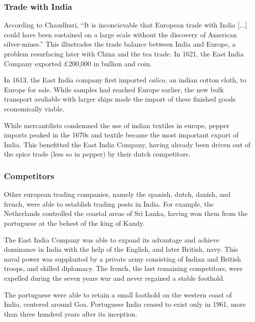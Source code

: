 \documentclass[11pt, a4paper, headings=standardclasses]{scrartcl}
\begin{document}
\subsubsection{Trade with India}

According to Chaudhuri, ``It is inconcievable that European trade with India [...] could have been sustained on a large scale without the discovery of American silver-mines.''\autocite[395]{FT} This illustrades the trade balance between India and Europe, a problem resurfacing later with China and the tea trade. In 1621, the East India Company exported \pounds{}200,000 in bullion and coin.\autocite[398]{FT}

In 1613, the East India company first imported \textit{calico}, an indian cotton cloth, to Europe for sale. While samples had reached Europe earlier, the new bulk transport avaliable with larger ships made the import of these finished goods economically viable.\autocite[400]{FT, Calico}

While mercantilists condemned the use of indian textiles in europe, pepper imports peaked in the 1670s\autocite[399]{FT} and textile became the most important export of India. This benefitted the East India Company, having already been driven out of the spice trade (less so in pepper) by their dutch competitors.\autocite[401--407]{FT}

\subsubsection{Competitors}

Other european trading companies, namely the spanish, dutch, danish, and french, were able to establish trading posts in India. For example, the Netherlands controlled the coastal areas of Sri Lanka, having won them from the portuguese at the behest of the king of Kandy.\autocite[Chapter 5]{dutch}

The East India Company was able to expand its advantage and achieve dominance in India with the help of the English, and later British, navy. This naval power was supplanted by a private army consisting of Indian and British troops, and skilled diplomacy.\autocite{battles} The french, the last remaining competitors, were expelled during the seven years war and never regained a stable foothold.\autocite[Chapter 7]{battles} 

The portuguese were able to retain a small foothold on the western coast of India, centered around Goa. Portuguese India ceased to exist only in 1961, more than three hundred years after its inception.\autocite{PortugueseIndia}
\end{document}
